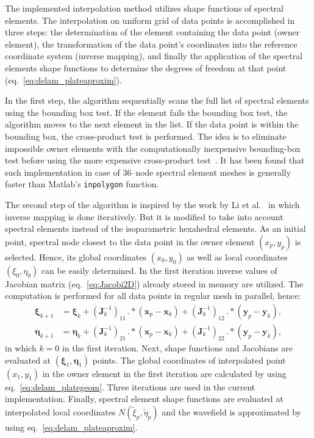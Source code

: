 \documentclass[preprint,12pt]{elsarticle}
\renewcommand{\vec}[1]{\mathbf{#1}}
\newcommand{\bs}[1]{\boldsymbol{#1}}
\begin{document}
	The implemented interpolation method utilizes shape functions of spectral elements. The interpolation on uniform grid of data points is accomplished in three steps: the determination of the element containing the data point (owner element), the transformation of the data point’s coordinates into the reference coordinate system (inverse mapping), and finally the application of the spectral elements shape functions to determine the degrees of freedom at that point (eq.~\ref{eq:delam_plateaproxim}).
	
	In the first step, the algorithm sequentially scans the full list of spectral elements using the bounding box test. If the element fails the bounding box test, the algorithm moves to the next element in the list. If the data point is within the bounding box, the cross-product test is performed. The idea is to eliminate impossible owner elements with the computationally inexpensive bounding-box test before using the more expensive cross-product test~\cite{Silva2009}. It has been found that such implementation in case of 36--node spectral element meshes is generally faster than Matlab's \verb|inpolygon| function. 
	
	The second step of the algorithm is inspired by the work by Li et al.~\cite{Li2014} in which inverse mapping is done iteratively. But it is modified to take into account spectral elements instead of the isoparametric hexahedral elements. As an initial point, spectral node closest to the data point in the owner element $(x_p, y_p)$ is selected. Hence, its global coordinates $(x_0, y_0)$ as well as local coordinates $(\xi_0,\eta_0)$  can be easily determined. In the first iteration inverse values of Jacobian matrix (eq.~\ref{eq:Jacobi2D}) already stored in memory are utilized. The computation is performed for all data points in regular mesh in parallel, hence: 
	\begin{equation}
	\begin{split}
	\bs{\xi}_{k+1}&=\bs{\xi}_k + \left(\vec{J}^{-1}_{k}\right)_{11}\,.*\left(\vec{x}_p-\vec{x}_k\right) +  \left(\vec{J}^{-1}_{k}\right)_{12}\,.*\left(\vec{y}_p-\vec{y}_k\right), \\
	\bs{\eta}_{k+1}&=\bs{\eta}_k + \left(\vec{J}^{-1}_{k}\right)_{21}\,.*\left(\vec{x}_p-\vec{x}_k\right) +  \left(\vec{J}^{-1}_{k}\right)_{22}\,.*\left(\vec{y}_p-\vec{y}_k\right),
	\end{split}
	\label{eq:interp_initial}
	\end{equation} 
	in which $k=0$ in the first iteration.
	Next, shape functions and Jacobians are evaluated at $(\bs{\xi}_{1}, \bs{\eta}_{1})$ points. The global coordinates of interpolated point $(x_1,y_1)$ in the owner element in the first iteration are calculated by using eq.~\ref{eq:delam_plategeom}. Three iterations are used in the current implementation. Finally, spectral element shape functions are evaluated at interpolated local coordinates $N(\tilde{\xi}_p,\tilde{\eta}_p)$ and the wavefield is approximated by using eq.~\ref{eq:delam_plateaproxim}.
\end{document}
